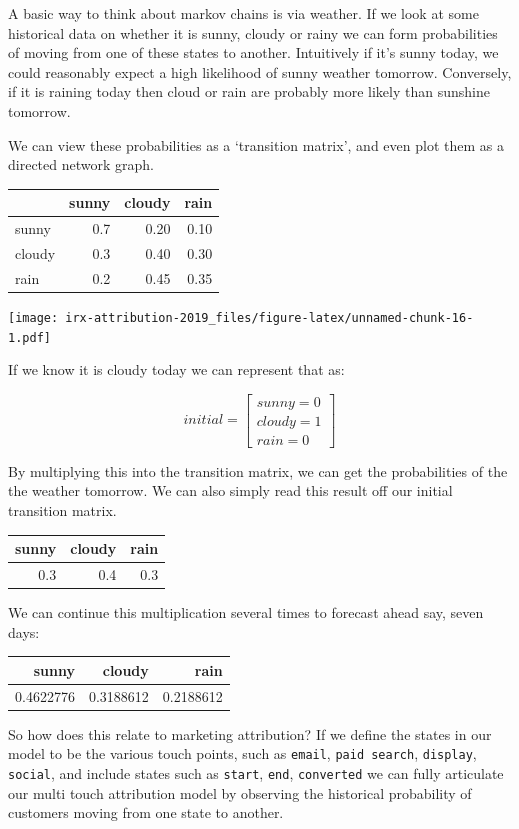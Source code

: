\documentclass[]{book}
\begin{document}
A basic way to think about markov chains is via weather. If we look at
some historical data on whether it is sunny, cloudy or rainy we can form
probabilities of moving from one of these states to another. Intuitively
if it's sunny today, we could reasonably expect a high likelihood of
sunny weather tomorrow. Conversely, if it is raining today then cloud or
rain are probably more likely than sunshine tomorrow.

We can view these probabilities as a `transition matrix', and even plot
them as a directed network graph.

\begin{tabular}{l|r|r|r}
\hline
  & sunny & cloudy & rain\\
\hline
sunny & 0.7 & 0.20 & 0.10\\
\hline
cloudy & 0.3 & 0.40 & 0.30\\
\hline
rain & 0.2 & 0.45 & 0.35\\
\hline
\end{tabular}

\texttt{[image: irx-attribution-2019\_files/figure-latex/unnamed-chunk-16-1.pdf]}

If we know it is cloudy today we can represent that as:

\[
initial = \begin{bmatrix} sunny = 0 \\ cloudy = 1 \\ rain = 0\end{bmatrix}
\]

By multiplying this into the transition matrix, we can get the
probabilities of the the weather tomorrow. We can also simply read this
result off our initial transition matrix.

\begin{tabular}{r|r|r}
\hline
sunny & cloudy & rain\\
\hline
0.3 & 0.4 & 0.3\\
\hline
\end{tabular}

We can continue this multiplication several times to forecast ahead say,
seven days:

\begin{tabular}{r|r|r}
\hline
sunny & cloudy & rain\\
\hline
0.4622776 & 0.3188612 & 0.2188612\\
\hline
\end{tabular}

So how does this relate to marketing attribution? If we define the
states in our model to be the various touch points, such as
\texttt{email}, \texttt{paid\ search}, \texttt{display},
\texttt{social}, and include states such as \texttt{start},
\texttt{end}, \texttt{converted} we can fully articulate our multi touch
attribution model by observing the historical probability of customers
moving from one state to another.
\end{document}
